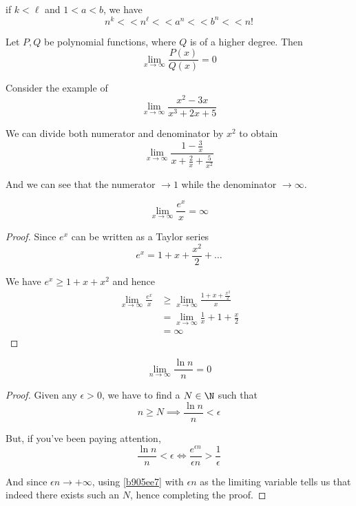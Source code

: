 if $k<\ell$ and $1<a<b$, we have
$$
  n^k << n^\ell << a^n << b^n << n!
$$

\label{ccfddb1}

Let $P,Q$ be polynomial functions, where $Q$ is of a higher degree. Then
$$
  \lim_{x\to\infty}\frac{P(x)}{Q(x)}=0
$$

\begin{compute}
  Consider the example of
  $$
    \lim_{x\to\infty}\frac{x^2 - 3x}{x^3 + 2x + 5}
  $$

  We can divide both numerator and denominator by $x^2$ to obtain
  $$
    \lim_{x\to\infty}\frac{1 - \frac3x}{x + \frac2x + \frac5{x^2}}
  $$

  And we can see that the numerator $\to1$ while the denominator $\to\infty$.
\end{compute}

\label{b905ee7}

$$
  \lim_{x\to\infty}\frac{e^x}x=\infty
$$

\begin{proof}
  Since $e^x$ can be written as a Taylor series
  $$
    e^x=1 + x + \frac{x^2}2 +\ldots
  $$

  We have $e^x\geq 1 + x + x^2$ and hence
  \begin{align*}
    \lim_{x\to\infty}\frac{e^x}x
     &\geq\lim_{x\to\infty}\frac{1+x+\frac{x^2}2}x \\
     &=\lim_{x\to\infty}\frac1x + 1 + \frac{x}2    \\
     &= \infty
  \end{align*}
\end{proof}

\label{e2e1632}

$$
  \lim_{n\to\infty}\frac{\ln n}n = 0
$$

\begin{proof}
  Given any $\epsilon>0$, we have to find a $N\in\N$ such that
  $$
    n\geq N\implies\frac{\ln n}n<\epsilon
  $$

  But, if you've been paying attention,
  $$
    \frac{\ln n}n<\epsilon\iff\frac{e^{\epsilon n}}{\epsilon n}>\frac1\epsilon
  $$

  And since $\epsilon n\to+\infty$, using \autoref{b905ee7} with $\epsilon n$
  as the limiting variable tells us that indeed there exists such an $N$, hence
  completing the proof.
\end{proof}

